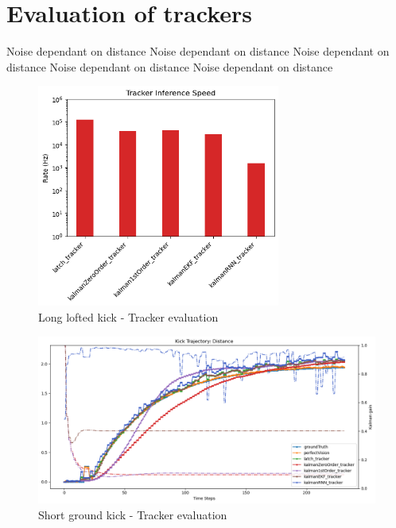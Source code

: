 \documentclass[a4paper,twoside,12pt]{report}
\begin{document}
\section{Evaluation of trackers}

Noise dependant on distance
Noise dependant on distance
Noise dependant on distance
Noise dependant on distance
Noise dependant on distance

\begin{figure}[h!]
\begin{center}
\includegraphics[width=8cm]{images/tracker_speeds.png}
\caption{Long lofted kick - Tracker evaluation}
\label{fig:ekfloftlong}
\end{center}
\end{figure}

\begin{figure}[h!]
\begin{center}
\includegraphics[width=12cm]{images/eval_ground_short.png}
\caption{Short ground kick - Tracker evaluation}
\label{fig:ekfgroundshort}
\end{center}
\end{figure}
\end{document}

